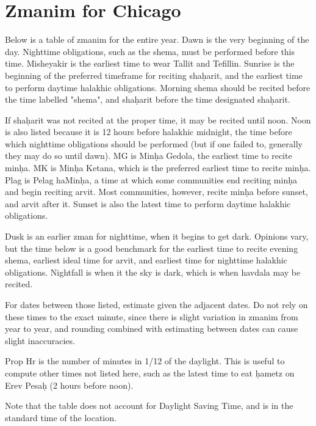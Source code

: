 \chapter{Zmanim for Chicago }

Below is a table of zmanim for the entire year. Dawn is the very beginning of the day. Nighttime obligations, such as the shema, must be performed before this time. Misheyakir is the earliest time to wear Tallit and Tefillin.  Sunrise is the beginning of the preferred timeframe for reciting sha\d{h}arit, and the earliest time to perform daytime halakhic obligations. Morning shema should be recited before the time labelled "shema", and sha\d{h}arit before the time designated sha\d{h}arit.

If sha\d{h}arit was not recited at the proper time, it may be recited until noon. Noon is also listed because it is 12 hours before halakhic midnight, the time before which nighttime obligations should be performed (but if one failed to, generally they may do so until dawn). MG is Min\d{h}a Gedola, the earliest time to recite min\d{h}a. MK is Min\d{h}a Ketana, which is the preferred earliest time to recite min\d{h}a. Plag is Pelag haMin\d{h}a, a time at which some communities end reciting min\d{h}a and begin reciting arvit. Most communities, however, recite min\d{h}a before sunset, and arvit after it. Sunset is also the latest time to perform daytime halakhic obligations.

Dusk is an earlier zman for nighttime, when it begins to get dark. Opinions vary, but the time below is a good benchmark for the earliest time to recite evening shema, earliest ideal time for arvit, and earliest time for nighttime halakhic obligations. Nightfall is when it the sky is dark, which is when havdala may be recited.

For dates between those listed, estimate given the adjacent dates. Do not rely on these times to the exact minute, since there is slight variation in zmanim from year to year, and rounding combined with estimating between dates can cause slight inaccuracies.

Prop Hr is the number of minutes in 1/12 of the daylight. This is useful to compute other times not listed here, such as the latest time to eat \d{h}ametz on Erev Pesa\d{h} (2 hours before noon).

Note that the table does not account for Daylight Saving Time, and is in the standard time of the location.

